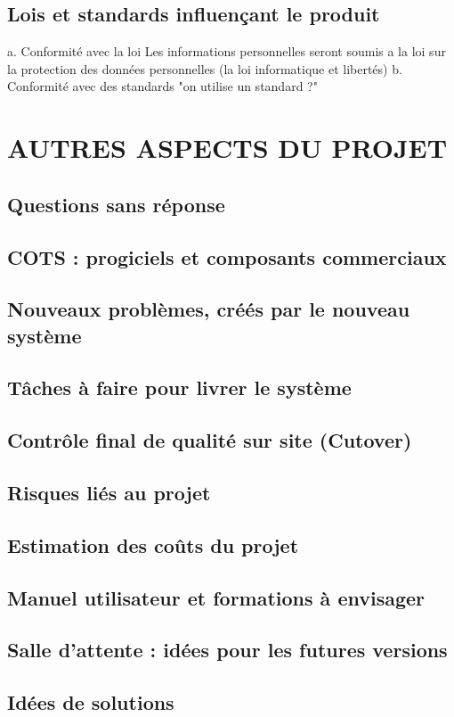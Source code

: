 \documentclass[a4]{article}
\begin{document}
		\subsection{Lois et standards influençant le produit}
		a. Conformité avec la loi
Les informations personnelles seront soumis a la loi sur la protection des données
personnelles (la loi informatique et libertés)
		b. Conformité avec des standards
		"on utilise un standard ?"
	\section{AUTRES ASPECTS DU PROJET}
		\subsection{Questions sans réponse}
		\subsection{COTS : progiciels et composants commerciaux}
		\subsection{Nouveaux problèmes, créés par le nouveau système}
		\subsection{Tâches à faire pour livrer le système}
		\subsection{Contrôle final de qualité sur site (Cutover)}
		\subsection{Risques liés au projet}
		\subsection{Estimation des coûts du projet}
		\subsection{Manuel utilisateur et formations à envisager}
		\subsection{Salle d’attente : idées pour les futures versions}
		\subsection{Idées de solutions}
\end{document}
